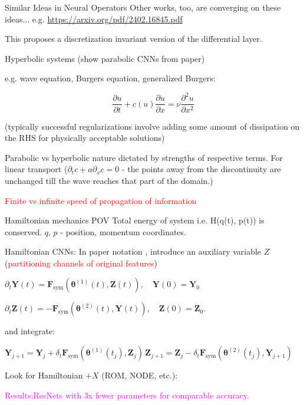 \documentclass[usenames,dvipsnames]{beamer}
\theoremstyle{definition}
\begin{document}
\begin{frame}{Similar Ideas in Neural Operators}
    Other works, too, are converging on these ideas... e.g. \cite{liu-schiaffini_neural_2024} \url{https://arxiv.org/pdf/2402.16845.pdf}

    This proposes a discretization invariant version of the differential layer.

\end{frame}


\begin{frame}{Hyperbolic systems}
    (show parabolic CNNs from paper)

    e.g. wave equation, Burgers equation,
    generalized Burgers:

    $$\frac{\partial u}{\partial t} + c(u) \frac{\partial{u}}{\partial{x}} = \nu \frac{\partial ^2 u}{\partial x^2}$$

    (typically successful regularizations involve adding some amount of dissipation on the RHS for physically acceptable solutions)

    Parabolic vs hyperbolic nature dictated by strengths of respective terms. For linear transport ($\partial_t c + a \partial_x c = 0$ - the points away from the discontinuity are unchanged till the wave reaches that part of the domain.)

    \textcolor{red}{Finite vs infinite speed of propagation of information}
    
\end{frame}

\begin{frame}{Hamiltonian mechanics POV}
    Total energy of system i.e. H(q(t), p(t)) is conserved. $q$, $p$ - position, momentum coordinates.

    Hamiltonian CNNs: In paper notation , introduce an auxiliary variable $Z$ (\textcolor{red}{partitioning channels of original features})

    $\partial_t\mathbf{Y}(t)=\mathbf{F}_\text{sym}(\boldsymbol{\theta}^{(1)}(t),\mathbf{Z}(t)),\quad\mathbf{Y}(0)=\mathbf{Y}_0$

    $\partial_t\mathbf{Z}(t)=-\mathbf{F}_\text{sym}(\boldsymbol{\theta}^{(2)}(t),\mathbf{Y}(t)),\quad\mathbf{Z}(0)=\mathbf{Z}_0.$

    and integrate:

    $\mathbf{Y}_{j+1}=\mathbf{Y}_j+\delta_t\mathbf{F}_{\mathrm{sym}}(\boldsymbol{\theta}^{(1)}(t_j),\mathbf{Z}_j) \,\mathbf{Z}_{j+1}=\mathbf{Z}_j-\delta_t\mathbf{F}_{\mathrm{sym}}(\boldsymbol{\theta}^{(2)}(t_j),\mathbf{Y}_{j+1})$


    Look for Hamiltonian $ +  X$ (ROM, NODE, etc.): \cite{greydanus_hamiltonian_2019,sharma_hamiltonian_2022,huh_time-reversal_2020}


    \textcolor{magenta}{Results:ResNets with 3x fewer parameters for comparable accuracy.}
\end{frame}
\end{document}
